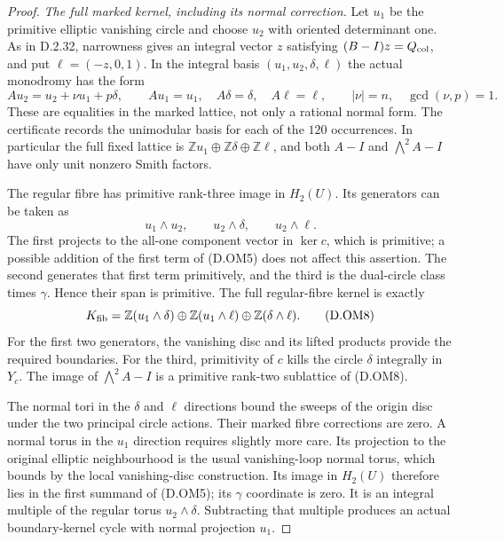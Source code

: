 \begin{proof}
\emph{The full marked kernel, including its normal correction.}
Let $u_1$ be the primitive elliptic vanishing circle and
choose $u_2$ with oriented determinant one. As in D.2.32,
narrowness gives an integral vector $z$ satisfying
$(B-I)z=Q_{\rm col}$, and put $\ell=(-z,0,1)$.
In the integral basis $(u_1,u_2,\delta,\ell)$ the actual
monodromy has the form
\[
 A u_2=u_2+\nu u_1+p\delta,\qquad
 A u_1=u_1,\quad A\delta=\delta,\quad A\ell=\ell,
 \qquad |\nu|=n,\quad\gcd(\nu,p)=1.                        \tag{D.OM6}
\]
These are equalities in the marked lattice, not only
a rational normal form. The certificate records the
unimodular basis for each of the $120$ occurrences.
In particular the full fixed lattice is
$\mathbb Zu_1\oplus\mathbb Z\delta\oplus\mathbb Z\ell$,
and both $A-I$ and $\bigwedge^2 A-I$ have only unit
nonzero Smith factors.

The regular fibre has primitive rank-three image in
$H_2(U)$. Its generators can be taken as
\[
 u_1\wedge u_2,\qquad u_2\wedge\delta,\qquad
 u_2\wedge\ell.                                           \tag{D.OM7}
\]
The first projects to the all-one component vector in
$\ker c$, which is primitive; a possible addition of
the first term of (D.OM5) does not affect this assertion.
The second generates that first term primitively, and
the third is the dual-circle class times $\gamma$.
Hence their span is primitive. The full regular-fibre
kernel is exactly
\[
 K_{\rm fib}=
 \mathbb Z(u_1\wedge\delta)\oplus
 \mathbb Z(u_1\wedge\ell)\oplus
 \mathbb Z(\delta\wedge\ell).                              \tag{D.OM8}
\]
For the first two generators, the vanishing disc and
its lifted products provide the required boundaries.
For the third, primitivity of $c$ kills the circle
$\delta$ integrally in $Y_c$. The image of
$\bigwedge^2 A-I$ is a primitive rank-two sublattice
of (D.OM8).

The normal tori in the $\delta$ and $\ell$ directions
bound the sweeps of the origin disc under the two
principal circle actions. Their marked fibre corrections
are zero. A normal torus in the $u_1$ direction requires
slightly more care. Its projection to the original
elliptic neighbourhood is the usual vanishing-loop
normal torus, which bounds by the local vanishing-disc
construction. Its image in $H_2(U)$ therefore lies in
the first summand of (D.OM5); its $\gamma$ coordinate
is zero. It is an integral multiple of the regular
torus $u_2\wedge\delta$. Subtracting that multiple
produces an actual boundary-kernel cycle with normal
projection $u_1$.


\end{proof}
